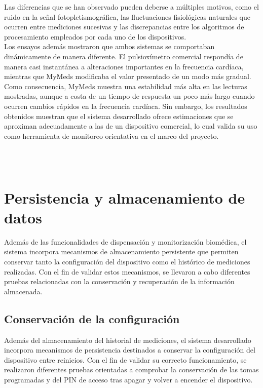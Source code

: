 Las diferencias que se han observado pueden deberse a múltiples motivos, como el ruido en la señal fotopletismográfica, las fluctuaciones fisiológicas naturales que ocurren entre mediciones sucesivas y las discrepancias entre los algoritmos de procesamiento empleados por cada uno de los dispositivos.\\

Los ensayos además mostraron que ambos sistemas se comportaban dinámicamente de manera diferente. El pulsioxímetro comercial respondía de manera casi instantánea a alteraciones importantes en la frecuencia cardíaca, mientras que MyMeds modificaba el valor presentado de un modo más gradual.\\

Como consecuencia, MyMeds muestra una estabilidad más alta en las lecturas mostradas, aunque a costa de un tiempo de respuesta un poco más largo cuando ocurren cambios rápidos en la frecuencia cardíaca. Sin embargo, los resultados obtenidos muestran que el sistema desarrollado ofrece estimaciones que se aproximan adecuadamente a las de un dispositivo comercial, lo cual valida su uso como herramienta de monitoreo orientativa en el marco del proyecto.\\

\

\

\section{Persistencia y almacenamiento de datos}

Además de las funcionalidades de dispensación y monitorización biomédica, el sistema incorpora mecanismos de almacenamiento persistente que permiten conservar tanto la configuración del dispositivo como el histórico de mediciones realizadas. Con el fin de validar estos mecanismos, se llevaron a cabo diferentes pruebas relacionadas con la conservación y recuperación de la información almacenada.\\

\subsection{Conservación de la configuración}

Además del almacenamiento del historial de mediciones, el sistema desarrollado incorpora mecanismos de persistencia destinados a conservar la configuración del dispositivo entre reinicios. Con el fin de validar su correcto funcionamiento, se realizaron diferentes pruebas orientadas a comprobar la conservación de las tomas programadas y del PIN de acceso tras apagar y volver a encender el dispositivo.\\

